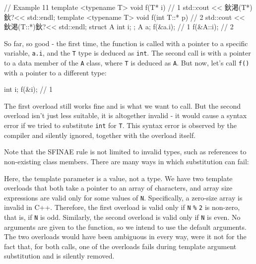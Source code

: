 \begin{code}
// Example 11
template <typename T> void f(T* i) {        // 1
  std::cout << 鈥渇(T*)鈥?<< std::endl;
}
template <typename T> void f(int T::* p) {    // 2
  std::cout << 鈥渇(T::*)鈥?<< std::endl;
}
struct A { int i; };
A a;
f(&a.i);    // 1
f(&A::i);    // 2
\end{code}

So far, so good - the first time, the function is called with a pointer to a specific variable, \texttt{a.i}, and the \texttt{T} type is deduced as \texttt{int}. The second call is with a pointer to a data member of the \texttt{A} class, where \texttt{T} is deduced as \texttt{A}. But now, let's call \texttt{f()} with a pointer to a different type:

\begin{code}
int i;
f(&i);    // 1
\end{code}

The first overload still works fine and is what we want to call. But the second overload isn't just less suitable, it is altogether invalid - it would cause a syntax error if we tried to substitute \texttt{int} for \texttt{T}. This syntax error is observed by the compiler and silently ignored, together with the overload itself.

Note that the SFINAE rule is not limited to invalid types, such as references to non-existing class members. There are many ways in which substitution can fail:


Here, the template parameter is a value, not a type. We have two template overloads that both take a pointer to an array of characters, and array size expressions are valid only for some values of \texttt{N}. Specifically, a zero-size array is invalid in C++. Therefore, the first overload is valid only if \texttt{N} \texttt{\%} \texttt{2} is non-zero, that is, if \texttt{N} is odd. Similarly, the second overload is valid only if \texttt{N} is even. No arguments are given to the function, so we intend to use the default arguments. The two overloads would have been ambiguous in every way, were it not for the fact that, for both calls, one of the overloads fails during template argument substitution and is silently removed.

